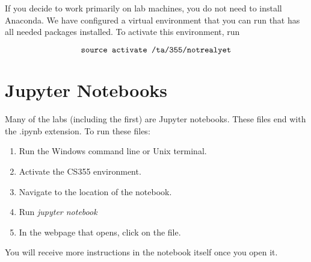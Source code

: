 \documentclass[11pt]{article}
\newif\ifinstructor
\begin{document}
If you decide to work primarily on lab machines, you do not need to install Anaconda. We have configured a virtual environment that you can run that has all needed packages installed. To activate this environment, run

\[
	\mbox{\tt source activate /ta/355/notrealyet}
\]


\divider

\section*{Jupyter Notebooks}

Many of the labs (including the first) are Jupyter notebooks. These files end with the .ipynb extension. To run these files:

\begin{enumerate}
    \item   Run the  Windows command line or Unix terminal.
    \item   Activate the CS355 environment.
    \item   Navigate to the location of the notebook.
    \item   Run \textit{jupyter notebook}
    \item   In the webpage that opens, click on the file.
\end{enumerate}

You will receive more instructions in the notebook itself once you open it.

\divider



\ifinstructor



\fi
\end{document}
